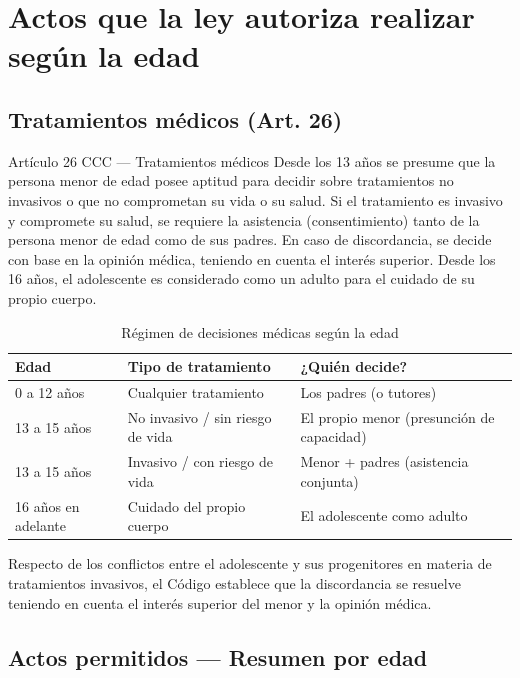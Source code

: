 \documentclass[12pt,oneside]{book}
\begin{document}
\chapter{Actos que la ley autoriza realizar según la edad}

\section{Tratamientos médicos (Art. 26)}

\begin{definition}{Artículo 26 CCC — Tratamientos médicos}
Desde los 13 años se presume que la persona menor de edad posee aptitud para decidir sobre tratamientos no invasivos o que no comprometan su vida o su salud. Si el tratamiento es invasivo y compromete su salud, se requiere la asistencia (consentimiento) tanto de la persona menor de edad como de sus padres. En caso de discordancia, se decide con base en la opinión médica, teniendo en cuenta el interés superior. Desde los 16 años, el adolescente es considerado como un adulto para el cuidado de su propio cuerpo.
\end{definition}

\begin{table}[H]
\centering
\caption{Régimen de decisiones médicas según la edad}
\begin{tabularx}{\textwidth}{lXX}
\toprule
\textbf{Edad} & \textbf{Tipo de tratamiento} & \textbf{¿Quién decide?} \\
\midrule
0 a 12 años & Cualquier tratamiento & Los padres (o tutores) \\
13 a 15 años & No invasivo / sin riesgo de vida & El propio menor (presunción de capacidad) \\
13 a 15 años & Invasivo / con riesgo de vida & Menor + padres (asistencia conjunta) \\
16 años en adelante & Cuidado del propio cuerpo & El adolescente como adulto \\
\bottomrule
\end{tabularx}
\end{table}

Respecto de los conflictos entre el adolescente y sus progenitores en materia de tratamientos invasivos, el Código establece que la discordancia se resuelve teniendo en cuenta el interés superior del menor y la opinión médica.

\section{Actos permitidos — Resumen por edad}
\end{document}
